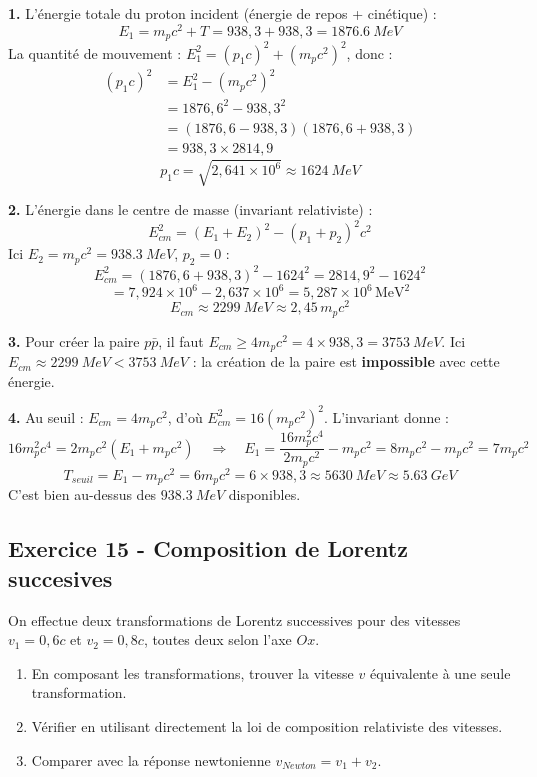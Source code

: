 \documentclass[12pt,a4paper]{article}
\begin{document}
\begin{boitecorrige}
\textbf{1.} L'énergie totale du proton incident (énergie de repos + cinétique) :
\[
E_1 = m_pc^2 + T = 938{,}3 + 938{,}3 = \qty{1876.6}{MeV}
\]
La quantité de mouvement : $E_1^2 = (p_1c)^2 + (m_pc^2)^2$, donc :
\begin{align*}
(p_1c)^2 &= E_1^2 - (m_pc^2)^2\\
         &= 1876{,}6^2 - 938{,}3^2\\
         &= (1876{,}6-938{,}3)(1876{,}6+938{,}3)\\
         &= 938{,}3\times2814{,}9
\end{align*}
\[
p_1c = \sqrt{2{,}641\times10^6} \approx \qty{1624}{MeV}
\]

\textbf{2.} L'énergie dans le centre de masse (invariant relativiste) :
\[
E_{cm}^2 = (E_1 + E_2)^2 - (p_1 + p_2)^2c^2
\]
Ici $E_2 = m_pc^2 = \qty{938.3}{MeV}$, $p_2 = 0$ :
\[
E_{cm}^2 = (1876{,}6+938{,}3)^2 - 1624^2 = 2814{,}9^2 - 1624^2
\]
\[
= 7{,}924\times10^6 - 2{,}637\times10^6 = 5{,}287\times10^6\,\text{MeV}^2
\]
\[
E_{cm} \approx \qty{2299}{MeV} \approx 2{,}45\,m_pc^2
\]

\textbf{3.} Pour créer la paire $p\bar{p}$, il faut $E_{cm} \geq 4m_pc^2 = 4\times938{,}3 = \qty{3753}{MeV}$. Ici $E_{cm}\approx\qty{2299}{MeV}<\qty{3753}{MeV}$ : la création de la paire est \textbf{impossible} avec cette énergie.

\textbf{4.} Au seuil : $E_{cm} = 4m_pc^2$, d'où $E_{cm}^2 = 16(m_pc^2)^2$. L'invariant donne :
\[
16m_p^2c^4 = 2m_pc^2(E_1 + m_pc^2) \quad\Rightarrow\quad E_1 = \frac{16m_p^2c^4}{2m_pc^2} - m_pc^2 = 8m_pc^2 - m_pc^2 = 7m_pc^2
\]
\[
T_{seuil} = E_1 - m_pc^2 = 6m_pc^2 = 6\times938{,}3 \approx \boxed{\qty{5630}{MeV} \approx \qty{5.63}{GeV}}
\]
C'est bien au-dessus des $\qty{938.3}{MeV}$ disponibles.
\end{boitecorrige}

\subsection*{Exercice 15 - Composition de Lorentz succesives \niveau{\difficile}}

\begin{boiteexercice}
On effectue deux transformations de Lorentz successives pour des vitesses $v_1 = 0{,}6c$ et $v_2 = 0{,}8c$, toutes deux selon l'axe $Ox$.
\begin{enumerate}
  \item En composant les transformations, trouver la vitesse $v$ équivalente à une seule transformation.
  \item Vérifier en utilisant directement la loi de composition relativiste des vitesses.
  \item Comparer avec la réponse newtonienne $v_{Newton} = v_1 + v_2$.
\end{enumerate}
\end{boiteexercice}
\end{document}
